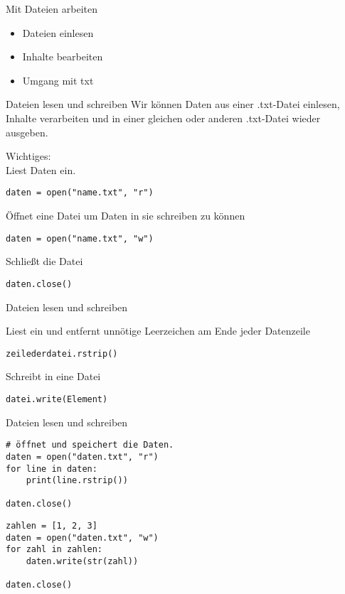 \begin{frame}[fragile]{Mit Dateien arbeiten}
	\begin{itemize}
		\item Dateien einlesen
		\item Inhalte bearbeiten
		\item Umgang mit txt
	\end{itemize}
\end{frame}

\begin{frame}[fragile]{Dateien lesen und schreiben}
Wir können Daten aus einer .txt-Datei einlesen, Inhalte verarbeiten und in einer gleichen oder anderen .txt-Datei wieder ausgeben.

Wichtiges:\\
 Liest Daten ein.
\begin{lstlisting}
daten = open("name.txt", "r")
\end{lstlisting}
 Öffnet eine Datei um Daten in sie schreiben zu können
\begin{lstlisting}
daten = open("name.txt", "w")
\end{lstlisting}
Schließt die Datei 
\begin{lstlisting}
daten.close()
\end{lstlisting}

\end{frame}


\begin{frame}[fragile]{Dateien lesen und schreiben}
 
Liest ein und entfernt unnötige Leerzeichen am Ende jeder Datenzeile
\begin{lstlisting}
zeilederdatei.rstrip()
\end{lstlisting}

 Schreibt in eine Datei
\begin{lstlisting}
datei.write(Element)
\end{lstlisting}
\end{frame}

\begin{frame}[fragile]{Dateien lesen und schreiben}
\begin{lstlisting}
# öffnet und speichert die Daten.
daten = open("daten.txt", "r")
for line in daten:
    print(line.rstrip())

daten.close()
\end{lstlisting}

\begin{lstlisting}
zahlen = [1, 2, 3]
daten = open("daten.txt", "w")
for zahl in zahlen:
    daten.write(str(zahl))

daten.close()
\end{lstlisting}
\end{frame}




